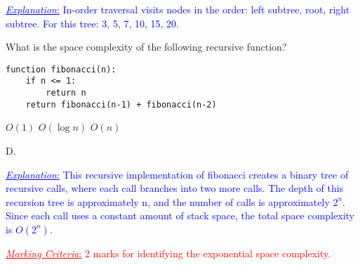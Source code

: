 \documentclass[addpoints,12pt]{exam}
\newcommand{\mycorrectchoice}[1]{\CorrectChoice \fbox{#1}}
\newcommand{\mycorrectchoice}[1]{\CorrectChoice #1}
\newcommand{\Exp}[1]{\textcolor{blue}{\underline{\emph{Explanation}:} #1}}
\newcommand{\MC}[1]{\textcolor{red}{\underline{\emph{Marking Criteria}:} #1}}
\begin{document}
\begin{questions}
\begin{parts}
\begin{solution}
    \Exp{
      In-order traversal visits nodes in the order: left subtree, root, right subtree.
      For this tree: 3, 5, 7, 10, 15, 20.
    }
  \end{solution}
\end{parts}

\vspace{20pt}

\question[2] What is the space complexity of the following recursive function?

\begin{verbatim}
function fibonacci(n):
    if n <= 1:
        return n
    return fibonacci(n-1) + fibonacci(n-2)
\end{verbatim}

\begin{choices}
  \choice $O(1)$
  \choice $O(\log n)$
  \choice $O(n)$
  \mycorrectchoice{$O(2^n)$}
\end{choices}

\begin{solution}
  D.
  
  \Exp{
    This recursive implementation of fibonacci creates a binary tree of recursive calls,
    where each call branches into two more calls. The depth of this recursion tree is approximately n,
    and the number of calls is approximately $2^n$. Since each call uses a constant amount of stack space,
    the total space complexity is $O(2^n)$.
  }
  
  \MC{
    2 marks for identifying the exponential space complexity.
  }
\end{solution}

\label{last_page}
\end{questions}
\end{document}
